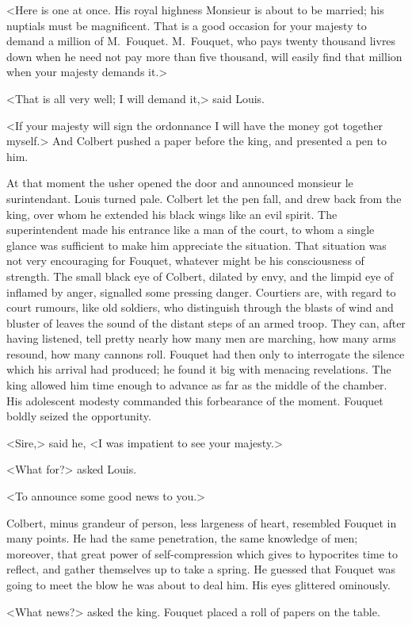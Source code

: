 <Here is one at once. His royal highness Monsieur is about to be married; his nuptials must be magnificent. That is a good occasion for your majesty to demand a million of M.~Fouquet. M.~Fouquet, who pays twenty thousand livres down when he need not pay more than five thousand, will easily find that million when your majesty demands it.>

<That is all very well; I will demand it,> said Louis.

<If your majesty will sign the ordonnance I will have the money got together myself.> And Colbert pushed a paper before the king, and presented a pen to him.

At that moment the usher opened the door and announced monsieur le surintendant. Louis turned pale. Colbert let the pen fall, and drew back from the king, over whom he extended his black wings like an evil spirit. The superintendent made his entrance like a man of the court, to whom a single glance was sufficient to make him appreciate the situation. That situation was not very encouraging for Fouquet, whatever might be his consciousness of strength. The small black eye of Colbert, dilated by envy, and the limpid eye of  inflamed by anger, signalled some pressing danger. Courtiers are, with regard to court rumours, like old soldiers, who distinguish through the blasts of wind and bluster of leaves the sound of the distant steps of an armed troop. They can, after having listened, tell pretty nearly how many men are marching, how many arms resound, how many cannons roll. Fouquet had then only to interrogate the silence which his arrival had produced; he found it big with menacing revelations. The king allowed him time enough to advance as far as the middle of the chamber. His adolescent modesty commanded this forbearance of the moment. Fouquet boldly seized the opportunity.

<Sire,> said he, <I was impatient to see your majesty.>

<What for?> asked Louis.

<To announce some good news to you.>

Colbert, minus grandeur of person, less largeness of heart, resembled Fouquet in many points. He had the same penetration, the same knowledge of men; moreover, that great power of self-compression which gives to hypocrites time to reflect, and gather themselves up to take a spring. He guessed that Fouquet was going to meet the blow he was about to deal him. His eyes glittered ominously.

<What news?> asked the king. Fouquet placed a roll of papers on the table.


